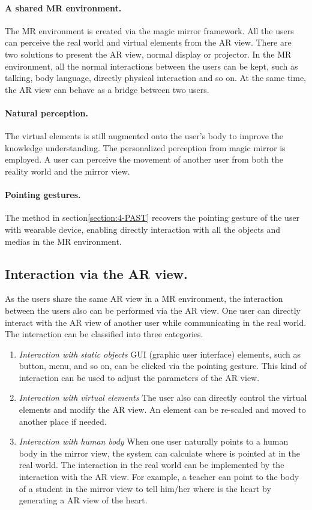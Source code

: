 \paragraph{A shared MR environment.} The MR environment is created via the magic mirror framework. All the users can perceive the real world and virtual elements from the AR view. There are two solutions to present the AR view, normal display or projector. In the MR environment, all the normal interactions between the users can be kept, such as talking, body language, directly physical interaction and so on. At the same time, the AR view can behave as a bridge between two users. 

\paragraph{Natural perception.}  The virtual elements is still augmented onto the user's body to improve the knowledge understanding. The personalized perception from magic mirror is employed. A user can perceive the movement of another user from both the reality world and the mirror view. 

\paragraph{Pointing gestures.} The method in section\ref{section:4-PAST} recovers the pointing gesture of the user with wearable device, enabling directly interaction with all the objects and medias in the MR environment.

\subsection{Interaction via the AR view.} As the users share the same AR view in a MR environment, the interaction between the users also can be performed via the AR view. One user can directly interact with the AR view of another user while communicating in the real world. The interaction can be classified into three categories.
\begin{enumerate}
	\item \emph{Interaction with static objects} GUI (graphic user interface) elements, such as button, menu, and so on, can be clicked via the pointing gesture. This kind of interaction can be used to adjust the parameters of the AR view. 
	\item \emph {Interaction with virtual elements} The user also can directly control the virtual elements and modify the AR view.  An element can be re-scaled and moved to another place if needed.
	\item \emph{Interaction with human body} When one user naturally points to a human body in the mirror view, the system can calculate where is pointed at in the real world. The interaction in the real world can be implemented by the interaction with the AR view. For example, a teacher can point to the body of a student in the mirror view to tell him/her where is the heart by generating a AR view of the heart.
\end{enumerate}

